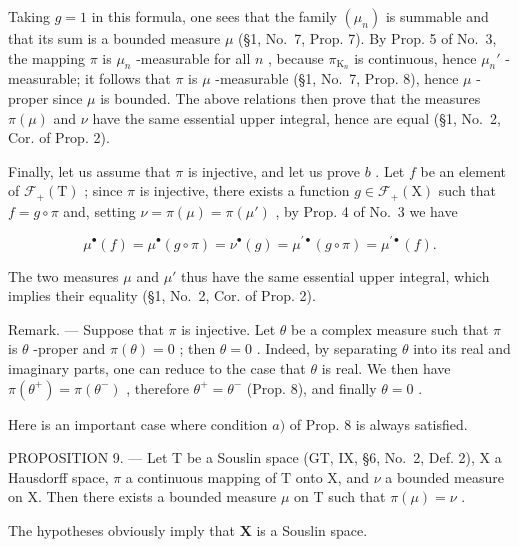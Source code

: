 Taking \(g = 1\) in this formula, one sees that the family \((\mu_n)\) is summable and that its sum is a bounded measure \(\mu\) (§1, No.~7, Prop. 7). By Prop. 5 of No.~3, the mapping \(\pi\) is \(\mu_n\) -measurable for all \(n\) , because \(\pi_{\mathrm{K}_n}\) is continuous, hence \(\mu_n'\) -measurable; it follows that \(\pi\) is \(\mu\) -measurable (§1, No.~7, Prop. 8), hence \(\mu\) -proper since \(\mu\) is bounded. The above relations then prove that the measures \(\pi(\mu)\) and \(\nu\) have the same essential upper integral, hence are equal (§1, No.~2, Cor. of Prop. 2).

Finally, let us assume that \(\pi\) is injective, and let us prove \(b\) . Let \(f\) be an element of \(\mathcal{F}_{+}(\mathrm{T})\) ; since \(\pi\) is injective, there exists a function \(g \in \mathcal{F}_{+}(\mathrm{X})\) such that \(f = g \circ \pi\) and, setting \(\nu = \pi(\mu) = \pi(\mu')\) , by Prop. 4 of No.~3 we have

\[
\mu^ {\bullet} (f) = \mu^ {\bullet} (g \circ \pi) = \nu^ {\bullet} (g) = \mu^ {\prime \bullet} (g \circ \pi) = \mu^ {\prime \bullet} (f).
\]

The two measures \(\mu\) and \(\mu'\) thus have the same essential upper integral, which implies their equality (§1, No.~2, Cor. of Prop. 2).

Remark. --- Suppose that \(\pi\) is injective. Let \(\theta\) be a complex measure such that \(\pi\) is \(\theta\) -proper and \(\pi(\theta)=0\) ; then \(\theta=0\) . Indeed, by separating \(\theta\) into its real and imaginary parts, one can reduce to the case that \(\theta\) is real. We then have \(\pi(\theta^{+})=\pi(\theta^{-})\) , therefore \(\theta^{+}=\theta^{-}\) (Prop. 8), and finally \(\theta=0\) .

Here is an important case where condition \(a)\) of Prop. 8 is always satisfied.

PROPOSITION 9. --- Let T be a Souslin space (GT, IX, §6, No.~2, Def. 2), X a Hausdorff space, \(\pi\) a continuous mapping of T onto X, and \(\nu\) a bounded measure on X. Then there exists a bounded measure \(\mu\) on T such that \(\pi(\mu) = \nu\) .

The hypotheses obviously imply that \(\mathbf{X}\) is a Souslin space.

